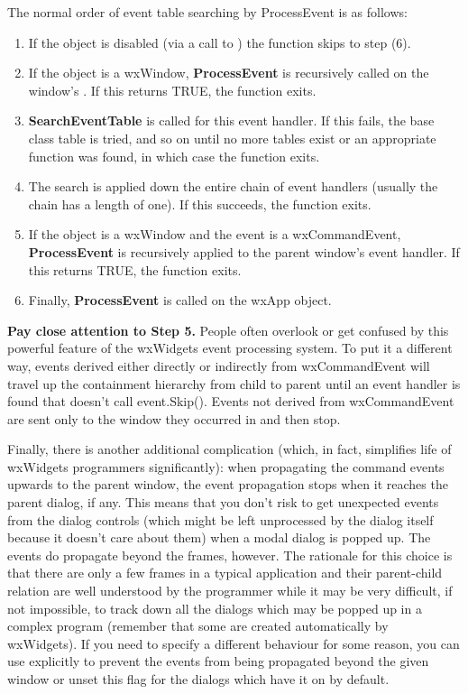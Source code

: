 The normal order of event table searching by ProcessEvent is as follows:

\begin{enumerate}\itemsep=0pt
\item If the object is disabled (via a call to )
the function skips to step (6).
\item If the object is a wxWindow, {\bf ProcessEvent} is recursively called on the window's\rtfsp
{}. If this returns TRUE, the function exits.
\item {\bf SearchEventTable} is called for this event handler. If this fails, the base
class table is tried, and so on until no more tables exist or an appropriate function was found,
in which case the function exits.
\item The search is applied down the entire chain of event handlers (usually the chain has a length
of one). If this succeeds, the function exits.
\item If the object is a wxWindow and the event is a wxCommandEvent, {\bf ProcessEvent} is
recursively applied to the parent window's event handler. If this returns TRUE, the function exits.
\item Finally, {\bf ProcessEvent} is called on the wxApp object.
\end{enumerate}

{\bf Pay close attention to Step 5.}  People often overlook or get
confused by this powerful feature of the wxWidgets event processing
system.  To put it a different way, events derived either directly or
indirectly from wxCommandEvent will travel up the containment
hierarchy from child to parent until an event handler is found that
doesn't call event.Skip().  Events not derived from wxCommandEvent are
sent only to the window they occurred in and then stop.

Finally, there is another additional complication (which, in fact, simplifies
life of wxWidgets programmers significantly): when propagating the command
events upwards to the parent window, the event propagation stops when it
reaches the parent dialog, if any. This means that you don't risk to get
unexpected events from the dialog controls (which might be left unprocessed by
the dialog itself because it doesn't care about them) when a modal dialog is
popped up. The events do propagate beyond the frames, however. The rationale
for this choice is that there are only a few frames in a typical application
and their parent-child relation are well understood by the programmer while it
may be very difficult, if not impossible, to track down all the dialogs which
may be popped up in a complex program (remember that some are created
automatically by wxWidgets). If you need to specify a different behaviour for
some reason, you can use 
explicitly to prevent the events from being propagated beyond the given window
or unset this flag for the dialogs which have it on by default.

